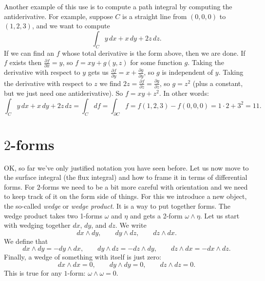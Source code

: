 \documentclass[12pt]{article}
\begin{document}
Another example of this use is to compute a path integral by computing the
antiderivative.  For example, suppose $C$ is a straight line from $(0,0,0)$
to $(1,2,3)$, and we want to compute
\begin{equation*}
\int_C y \, dx + x \, dy + 2z \, dz.
\end{equation*}
If we can find an $f$ whose total derivative is the form above, then
we are done.  If $f$ exists then $\frac{\partial f}{\partial x} = y$,
so $f = xy + g(y,z)$ for some function $g$.  Taking the derivative
with respect to $y$ gets us
$\frac{\partial f}{\partial y} = x + \frac{\partial g}{\partial y}$,
so $g$ is independent of $y$.  Taking the derivative with respect
to $z$ we find
$2z = \frac{\partial f}{\partial z} = \frac{\partial g}{\partial z}$,
so $g = z^2$ (plus a constant, but we just need one antiderivative).
So $f = xy+z^2$.  In other words:
\begin{equation*}
\int_C y \, dx + x \, dy + 2z \, dz
=
\int_C df = \int_{\partial C} f
= f(1,2,3) - f(0,0,0) = 1\cdot 2+3^2 = 11.
\end{equation*}

\section*{$2$-forms}

OK, so far we've only justified notation you have seen before.
Let us now move to the surface integral (the flux integral) and how to frame it in terms
of differential forms.
For $2$-forms we need to be a bit more careful with orientation and we
need to keep track of it on the form side of things.  For this we introduce
a new object, the so-called \emph{wedge} or \emph{wedge product}.  It is a
way to put together forms.
The wedge product takes two 1-forms $\omega$ and $\eta$ and gets
a 2-form $\omega \wedge \eta$.  Let us start with wedging together $dx$, $dy$, and $dz$.
We write
\[
dx \wedge dy, \qquad
dy \wedge dz, \qquad
dz \wedge dx .
\]
We define that 
\[
dx \wedge dy = - dy \wedge dx, \qquad
dy \wedge dz = - dz \wedge dy, \qquad
dz \wedge dx = - dx \wedge dz .
\]
Finally, a wedge of something with itself is just zero:
\[
dx \wedge dx = 0, \qquad
dy \wedge dy = 0, \qquad
dz \wedge dz = 0 .
\]
This is true for any $1$-form: $\omega \wedge \omega = 0$.
\end{document}
